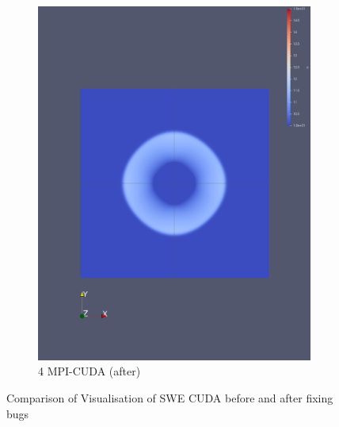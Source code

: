 \documentclass[article]{scrartcl}
\begin{document}
\begin{figure}[htpb]
\begin{subfigure}{.3\textwidth}
    \includegraphics[width=\textwidth,keepaspectratio=true]{../figs/1_validation_cuda_fixed_4mpi.png}
    \caption{4 MPI-CUDA (after)}
    \label{fig:1mpi-cuda-fixed}
    \end{subfigure}
    \caption{Comparison of Visualisation of SWE CUDA before and after fixing bugs}
    \label{figs:validation_cuda}
\end{figure}
\end{document}
